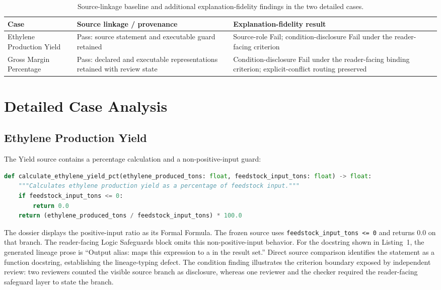 \documentclass[a4paper,fleqn]{cas-dc}
\begin{document}
\begin{table}[t]
\centering
\caption{Source-linkage baseline and additional explanation-fidelity findings in the two detailed cases.}
\label{tab:baseline}
\begin{tabularx}{\columnwidth}{@{}lYY@{}}
\toprule
Case & Source linkage / provenance & Explanation-fidelity result \\
\midrule
Ethylene Production Yield & Pass: source statement and executable guard retained & Source-role Fail; condition-disclosure Fail under the reader-facing criterion \\
Gross Margin Percentage & Pass: declared and executable representations retained with review state & Condition-disclosure Fail under the reader-facing binding criterion; explicit-conflict routing preserved \\
\bottomrule
\end{tabularx}
\end{table}
\FloatBarrier
\section{Detailed Case Analysis}
\subsection{Ethylene Production Yield}
The Yield source contains a percentage calculation and a non-positive-input guard:
\begin{lstlisting}[float=tbp,language=Python,breaklines=true,breakatwhitespace=true,caption={Verbatim Yield source excerpt from the frozen dossier source; SHA-256 identity is retained in the supplement.}]
def calculate_ethylene_yield_pct(ethylene_produced_tons: float, feedstock_input_tons: float) -> float:
    """Calculates ethylene production yield as a percentage of feedstock input."""
    if feedstock_input_tons <= 0:
        return 0.0
    return (ethylene_produced_tons / feedstock_input_tons) * 100.0
\end{lstlisting}
The dossier displays the positive-input ratio as its Formal Formula. The frozen source uses \texttt{feedstock\_\allowbreak{}input\_\allowbreak{}tons <= 0} and returns 0.0 on that branch. The reader-facing Logic Safeguards block omits this non-positive-input behavior. For the docstring shown in Listing~1, the generated lineage prose is ``Output alias: maps this expression to a in the result set.'' Direct source comparison identifies the statement as a function docstring, establishing the lineage-typing defect. The condition finding illustrates the criterion boundary exposed by independent review: two reviewers counted the visible source branch as disclosure, whereas one reviewer and the checker required the reader-facing safeguard layer to state the branch.
\end{document}
